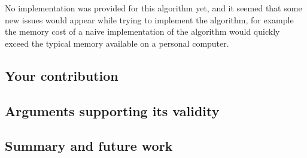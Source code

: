   No implementation was provided for this algorithm yet, and it seemed that
  some new issues would appear while trying to implement the algorithm, for
  example the memory cost of a naive implementation of the algorithm would
  quickly exceed the typical memory available on a personal computer.

\subsection*{Your contribution}


\subsection*{Arguments supporting its validity}


\subsection*{Summary and future work}

